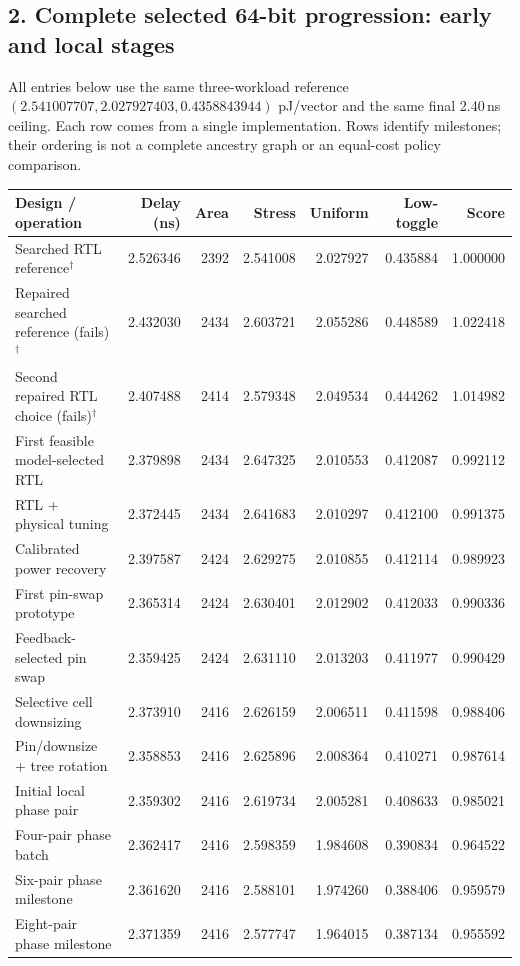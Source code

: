 \documentclass[10pt]{article}
\newcommand{\sect}[1]{\subsection*{#1}}
\begin{document}
\newpage
\sect{2. Complete selected 64-bit progression: early and local stages}
All entries below use the same three-workload reference $(2.541007707,2.027927403,0.4358843944)$ pJ/vector and the same final 2.40\,ns ceiling. Each row comes from a single implementation. Rows identify milestones; their ordering is not a complete ancestry graph or an equal-cost policy comparison.
\begin{center}\fontsize{8.4}{10.1}\selectfont\setlength{\tabcolsep}{3.6pt}
\begin{tabular}{@{}>{\raggedright\arraybackslash}p{5.3cm}rrrrrr@{}}\toprule
Design / operation & Delay (ns) & Area & Stress & Uniform & Low-toggle & Score\\\midrule
Searched RTL reference$^{\dagger}$ & 2.526346 & 2392 & 2.541008 & 2.027927 & 0.435884 & 1.000000\\
Repaired searched reference (fails)$^{\dagger}$ & 2.432030 & 2434 & 2.603721 & 2.055286 & 0.448589 & 1.022418\\
Second repaired RTL choice (fails)$^{\dagger}$ & 2.407488 & 2414 & 2.579348 & 2.049534 & 0.444262 & 1.014982\\
First feasible model-selected RTL & 2.379898 & 2434 & 2.647325 & 2.010553 & 0.412087 & 0.992112\\
RTL + physical tuning & 2.372445 & 2434 & 2.641683 & 2.010297 & 0.412100 & 0.991375\\
Calibrated power recovery & 2.397587 & 2424 & 2.629275 & 2.010855 & 0.412114 & 0.989923\\
First pin-swap prototype & 2.365314 & 2424 & 2.630401 & 2.012902 & 0.412033 & 0.990336\\
Feedback-selected pin swap & 2.359425 & 2424 & 2.631110 & 2.013203 & 0.411977 & 0.990429\\
Selective cell downsizing & 2.373910 & 2416 & 2.626159 & 2.006511 & 0.411598 & 0.988406\\
Pin/downsize + tree rotation & 2.358853 & 2416 & 2.625896 & 2.008364 & 0.410271 & 0.987614\\
Initial local phase pair & 2.359302 & 2416 & 2.619734 & 2.005281 & 0.408633 & 0.985021\\
Four-pair phase batch & 2.362417 & 2416 & 2.598359 & 1.984608 & 0.390834 & 0.964522\\
Six-pair phase milestone & 2.361620 & 2416 & 2.588101 & 1.974260 & 0.388406 & 0.959579\\
Eight-pair phase milestone & 2.371359 & 2416 & 2.577747 & 1.964015 & 0.387134 & 0.955592\\

\end{tabular}
\end{center}
\end{document}
